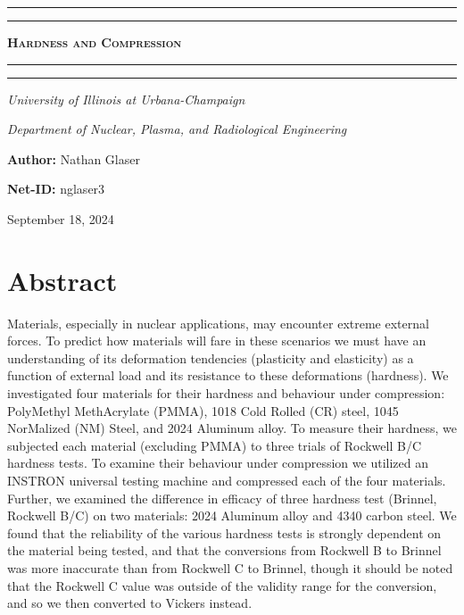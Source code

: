 \documentclass{article}
\begin{document}
\begin{titlepage}

\centering
\scshape
\vspace{\baselineskip}

%
\rule{\textwidth}{1.6pt}\vspace*{-\baselineskip}\vspace*{2pt}
\rule{\textwidth}{0.4pt}

{\Huge \textbf{\textsc{ Hardness and Compression \\
\vspace{15pt}}}}

\rule{\textwidth}{0.4pt}\vspace*{-\baselineskip}\vspace{3.2pt}
\rule{\textwidth}{1.6pt}\vspace{6pt}
\centerline{\textit{University of Illinois at Urbana-Champaign}} 
\centerline{\textit{Department of Nuclear, Plasma, and Radiological Engineering}}
\vspace{1.5\baselineskip}


\large \centerline{\textbf{Author:} Nathan Glaser}
\large \centerline{\textbf{Net-ID:} nglaser3}
\quad

\vfill
\large \centerline{September 18, 2024}
%
\end{titlepage}

\tableofcontents
\newpage
{}

\section{Abstract}

Materials, especially in nuclear applications, may encounter extreme external forces. To predict how materials will fare in these scenarios we must have an understanding of its deformation tendencies (plasticity and elasticity) as a function of external load and its resistance to these deformations (hardness). We investigated four materials for their hardness and behaviour under compression: PolyMethyl MethAcrylate (PMMA), 1018 Cold Rolled (CR) steel, 1045 NorMalized (NM) Steel, and 2024 Aluminum alloy. To measure their hardness, we subjected each material (excluding PMMA) to three trials of Rockwell B/C hardness tests. To examine their behaviour under compression we utilized an INSTRON universal testing machine and compressed each of the four materials. Further, we examined the difference in efficacy of three hardness test (Brinnel, Rockwell B/C) on two materials: 2024 Aluminum alloy and 4340 carbon steel. We found that the reliability of the various hardness tests is strongly dependent on the material being tested, and that the conversions from Rockwell B to Brinnel was more inaccurate than from Rockwell C to Brinnel, though it should be noted that the Rockwell C value was outside of the validity range for the conversion, and so we then converted to Vickers instead. 
\end{document}
